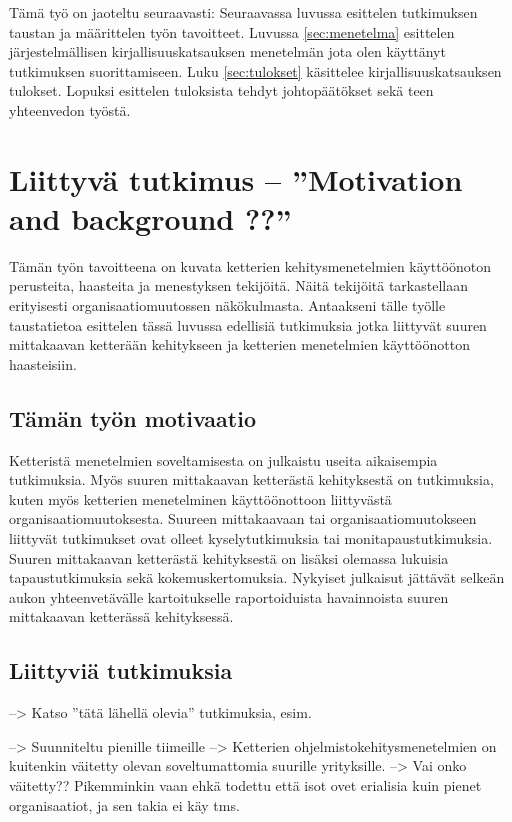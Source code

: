 Tämä työ on jaoteltu seuraavasti:
Seuraavassa luvussa esittelen tutkimuksen taustan ja määrittelen työn
tavoitteet. Luvussa \ref{sec:menetelma} esittelen järjestelmällisen
kirjallisuuskatsauksen menetelmän jota olen käyttänyt tutkimuksen
suorittamiseen. Luku \ref{sec:tulokset} käsittelee kirjallisuuskatsauksen
tulokset. Lopuksi esittelen tuloksista tehdyt johtopäätökset sekä teen
yhteenvedon työstä.



\section{Liittyvä tutkimus -- \small{''Motivation and background ??''}}
\label{sec:tausta}

Tämän työn tavoitteena on kuvata ketterien kehitysmenetelmien käyttöönoton
perusteita, haasteita ja menestyksen tekijöitä. Näitä tekijöitä tarkastellaan
erityisesti organisaatiomuutossen näkökulmasta. Antaakseni tälle työlle
taustatietoa esittelen tässä luvussa edellisiä tutkimuksia jotka liittyvät
suuren mittakaavan ketterään kehitykseen ja ketterien menetelmien käyttöönotton
haasteisiin.

\subsection{Tämän työn motivaatio}
Ketteristä menetelmien soveltamisesta on julkaistu useita aikaisempia
tutkimuksia. Myös suuren mittakaavan ketterästä kehityksestä on tutkimuksia,
kuten myös ketterien menetelminen käyttöönottoon liittyvästä
organisaatiomuutoksesta. Suureen mittakaavaan tai organisaatiomuutokseen
liittyvät tutkimukset ovat olleet kyselytutkimuksia tai monitapaustutkimuksia.
Suuren mittakaavan ketterästä kehityksestä on lisäksi olemassa lukuisia
tapaustutkimuksia sekä kokemuskertomuksia. Nykyiset julkaisut jättävät selkeän
aukon yhteenvetävälle kartoitukselle raportoiduista havainnoista suuren
mittakaavan ketterässä kehityksessä.

\subsection{Liittyviä tutkimuksia}
--> Katso ''tätä lähellä olevia'' tutkimuksia, esim. 

--> Suunniteltu pienille tiimeille --> Ketterien ohjelmistokehitysmenetelmien on
kuitenkin väitetty olevan soveltumattomia suurille yrityksille. --> Vai onko
väitetty?? Pikemminkin vaan ehkä todettu että isot ovet erialisia kuin pienet
organisaatiot, ja sen takia ei käy tms.

